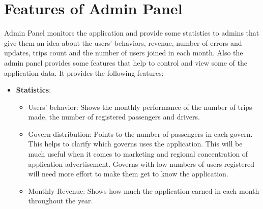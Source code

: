\section{Features of Admin Panel}
\hspace{2cm}Admin Panel monitors the application and provide some statistics to admins that give them an idea about the users’ behaviors, revenue, number of errors and updates, trips count and the number of users joined in each month. Also the admin panel provides some features that help to control and view some of the application data.
It provides the following features:
\begin{itemize}
\item \textbf{Statistics}:
\begin{itemize}
    \item Users’ behavior: Shows the monthly performance of the number of trips made, the number of registered passengers and drivers.
    
    \item Govern distribution: Points to the number of passengers in each govern. This helps to clarify which governs uses the application. This will be much useful when it comes to marketing and regional concentration of application advertisement. Governs with low numbers of users registered will need more effort to make them get to know the application.
    
	\item Monthly Revenue: Shows how much the application earned in each month throughout the year.
	

\end{itemize}
\end{itemize}
